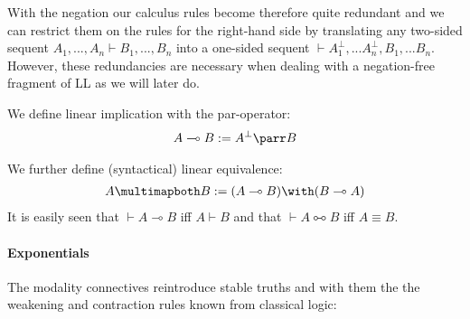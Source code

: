 \documentclass[DIN, pagenumber=false, fontsize=11pt, parskip=half, colorinlistoftodos, svgnames]{scrartcl}
\begin{document}
	With the negation our calculus rules become therefore quite redundant and we can restrict them on the rules for the right-hand side by translating any two-sided sequent 
	$A_1, ..., A_n \vdash B_1, ..., B_n$ 
	into a one-sided sequent 
	$\vdash A_1^\bot, ... A_n^\bot, B_1, ... B_n$. 
	However, these redundancies are necessary when dealing with a negation-free fragment of LL as we will later do.
	
	
	\begin{definition}
		We define linear implication with the par-operator:
		\begin{align*}
			A \multimap B := A^\bot \parr B
		\end{align*}
		
		We further define (syntactical) linear equivalence:
		\begin{align*}
			A \multimapboth B := (A \multimap B) \with (B \multimap A)
		\end{align*}
		It is easily seen that $\vdash A\multimap B$ iff $A \vdash B$ and that $\vdash A \multimapboth B$ iff $A \equiv B$. 
	\end{definition}
	
	\paragraph{Exponentials }
	The modality connectives reintroduce stable truths and with them the the weakening and contraction rules known from classical logic:
	
\end{document}
